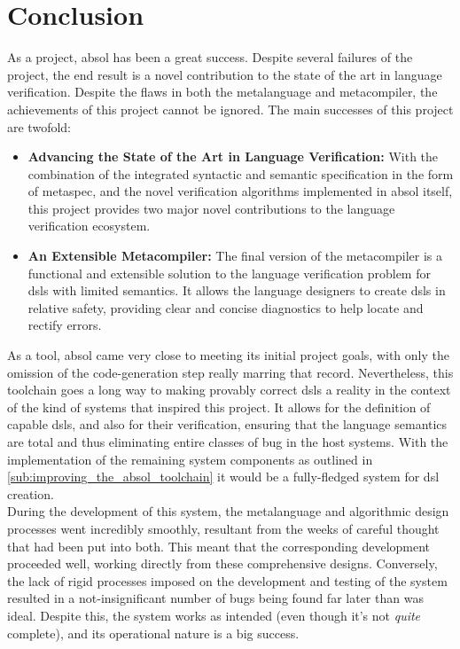 \chapter{Conclusion} %
\label{cha:conclusion}
As a project, \gls{absol} has been a great success.
Despite several failures of the project, the end result is a novel contribution to the state of the art in language verification. 
Despite the flaws in both the metalanguage and metacompiler, the achievements of this project cannot be ignored. 
The main successes of this project are twofold:
\begin{itemize}
    \item \textbf{Advancing the State of the Art in Language Verification:} With the combination of the integrated syntactic and semantic specification in the form of \gls{metaspec}, and the novel verification algorithms implemented in \gls{absol} itself, this project provides two major novel contributions to the language verification ecosystem.
    \item \textbf{An Extensible Metacompiler:} The final version of the metacompiler is a functional and extensible solution to the language verification problem for \glspl{dsl} with limited semantics.
    It allows the language designers to create \glspl{dsl} in relative safety, providing clear and concise diagnostics to help locate and rectify errors.
\end{itemize}

As a tool, \gls{absol} came very close to meeting its initial project goals, with only the omission of the code-generation step really marring that record. 
Nevertheless, this toolchain goes a long way to making provably correct \glspl{dsl} a reality in the context of the kind of systems that inspired this project.
It allows for the definition of capable \glspl{dsl}, and also for their verification, ensuring that the language semantics are total and thus eliminating entire classes of bug in the host systems.
With the implementation of the remaining system components as outlined in \autoref{sub:improving_the_absol_toolchain} it would be a fully-fledged system for \gls{dsl} creation.\\

During the development of this system, the metalanguage and algorithmic design processes went incredibly smoothly, resultant from the weeks of careful thought that had been put into both. 
This meant that the corresponding development proceeded well, working directly from these comprehensive designs.
Conversely, the lack of rigid processes imposed on the development and testing of the system resulted in a not-insignificant number of bugs being found far later than was ideal.
Despite this, the system works as intended (even though it's not \textit{quite} complete), and its operational nature is a big success. \\

